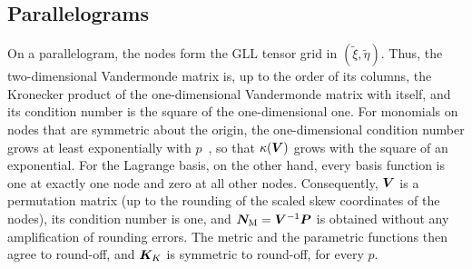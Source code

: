 \subsection{Parallelograms}
\label{sec:basis-affine}
%
On a parallelogram, the nodes form the GLL tensor grid in $(\tilde\xi,\tilde\eta)$. Thus, the two-dimensional Vandermonde matrix is, up to the order of its columns, the Kronecker product of the one-dimensional Vandermonde matrix with itself, and its condition number is the square of the one-dimensional one. For monomials on nodes that are symmetric about the origin, the one-dimensional condition number grows at least exponentially with $p$~\cite{Gautschi1988Lower}, so that $\kappa(\bm{V})$ grows with the square of an exponential. For the Lagrange basis, on the other hand, every basis function is one at exactly one node and zero at all other nodes. Consequently, $\bm{V}$ is a permutation matrix (up to the rounding of the scaled skew coordinates of the nodes), its condition number is one, and $\bm{N}_{\mathrm M}=\bm{V}^{-1}\bm{P}$ is obtained without any amplification of rounding errors. The metric and the parametric functions then agree to round-off, and $\bm{K}_K$ is symmetric to round-off, for every $p$.
%
